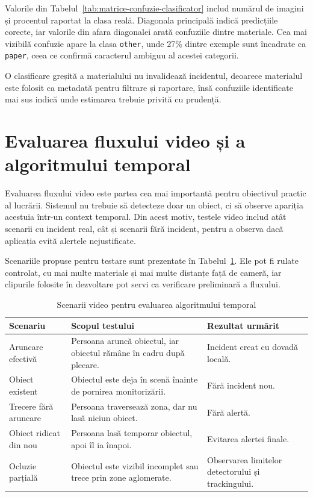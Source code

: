 Valorile din Tabelul~\ref{tab:matrice-confuzie-clasificator} includ numărul de imagini și procentul raportat la clasa reală. Diagonala principală indică predicțiile corecte, iar valorile din afara diagonalei arată confuziile dintre materiale. Cea mai vizibilă confuzie apare la clasa \texttt{other}, unde 27\% dintre exemple sunt încadrate ca \texttt{paper}, ceea ce confirmă caracterul ambiguu al acestei categorii.

O clasificare greșită a materialului nu invalidează incidentul, deoarece materialul este folosit ca metadată pentru filtrare și raportare, însă confuziile identificate mai sus indică unde estimarea trebuie privită cu prudență.

\section{Evaluarea fluxului video și a algoritmului temporal}

Evaluarea fluxului video este partea cea mai importantă pentru obiectivul practic al lucrării. Sistemul nu trebuie să detecteze doar un obiect, ci să observe apariția acestuia într-un context temporal. Din acest motiv, testele video includ atât scenarii cu incident real, cât și scenarii fără incident, pentru a observa dacă aplicația evită alertele nejustificate.

Scenariile propuse pentru testare sunt prezentate în Tabelul~\ref{tab:scenarii-video}. Ele pot fi rulate controlat, cu mai multe materiale și mai multe distanțe față de cameră, iar clipurile folosite în dezvoltare pot servi ca verificare preliminară a fluxului.

\begin{table}[!htbp]
\centering
\begingroup
\small
{}
\renewcommand{\arraystretch}{1.08}
\setlength{\tabcolsep}{4pt}
\begin{tabular}{|>{\raggedright\arraybackslash}p{3.15cm}|>{\raggedright\arraybackslash}p{6.25cm}|>{\raggedright\arraybackslash}p{4.1cm}|}
\hline
\textbf{Scenariu} & \textbf{Scopul testului} & \textbf{Rezultat urmărit} \\
\hline
Aruncare efectivă & Persoana aruncă obiectul, iar obiectul rămâne în cadru după plecare. & Incident creat cu dovadă locală. \\
\hline
Obiect existent & Obiectul este deja în scenă înainte de pornirea monitorizării. & Fără incident nou. \\
\hline
Trecere fără aruncare & Persoana traversează zona, dar nu lasă niciun obiect. & Fără alertă. \\
\hline
Obiect ridicat din nou & Persoana lasă temporar obiectul, apoi îl ia înapoi. & Evitarea alertei finale. \\
\hline
Ocluzie parțială & Obiectul este vizibil incomplet sau trece prin zone aglomerate. & Observarea limitelor detectorului și trackingului. \\
\hline
\end{tabular}
\endgroup
\caption{Scenarii video pentru evaluarea algoritmului temporal}
\label{tab:scenarii-video}
\end{table}

